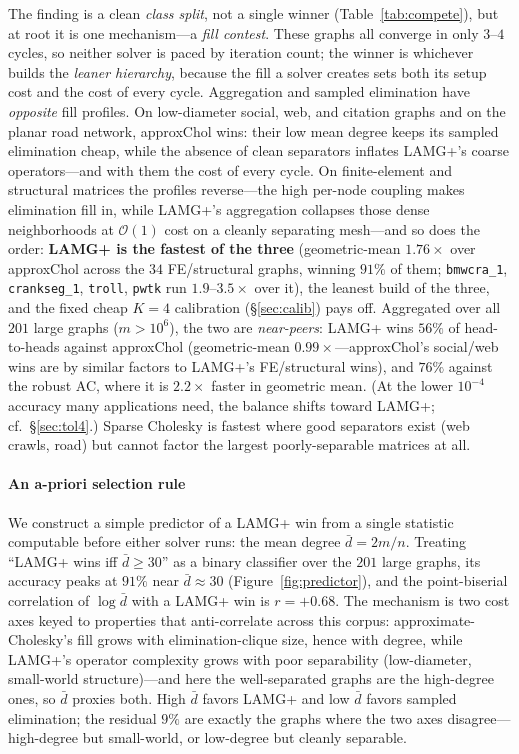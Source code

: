\documentclass[review]{siamart220329}
\newcommand{\Oone}{\mathcal{O}(1)}
\begin{document}
The finding is a clean \emph{class split}, not a single winner (Table~\ref{tab:compete}), but at root it is one
mechanism---a \emph{fill contest}. These graphs all converge in only $3$--$4$ cycles, so neither
solver is paced by iteration count; the winner is whichever builds the \emph{leaner hierarchy},
because the fill a solver creates sets both its setup cost and the cost of every cycle. Aggregation
and sampled elimination have \emph{opposite} fill profiles. On low-diameter social, web, and citation
graphs and on the planar road network, approxChol wins: their low mean degree keeps its sampled
elimination cheap, while the absence of clean separators inflates LAMG+'s coarse operators---and with
them the cost of every cycle. On finite-element and structural matrices the profiles reverse---the high per-node
coupling makes elimination fill in, while LAMG+'s aggregation collapses those dense neighborhoods at
$\Oone$ cost on a cleanly separating mesh---and so does the order: \textbf{LAMG+ is the fastest of the three} (geometric-mean
$1.76\times$ over approxChol across the $34$ FE/structural graphs, winning $91\%$ of them;
\texttt{bmwcra\_1}, \texttt{crankseg\_1}, \texttt{troll}, \texttt{pwtk} run $1.9$--$3.5\times$ over
it), the leanest build of the three, and the fixed cheap $K{=}4$ calibration (\S\ref{sec:calib})
pays off. Aggregated over all
$201$ large graphs ($m>10^6$), the two are \emph{near-peers}: LAMG+ wins $56\%$ of head-to-heads
against approxChol (geometric-mean $0.99\times$---approxChol's social/web
wins are by similar factors to LAMG+'s FE/structural wins), and $76\%$ against the robust AC, where
it is $2.2\times$ faster in geometric mean. (At the lower $10^{-4}$ accuracy many applications need, the balance shifts toward LAMG+; cf.~\S\ref{sec:tol4}.) Sparse Cholesky is fastest where good separators exist (web crawls, road)
but cannot factor the largest poorly-separable matrices at all.

\paragraph{An a-priori selection rule} We construct a simple predictor of a LAMG+ win from a single
statistic computable before either solver runs: the mean degree $\bar d=2m/n$. Treating
``LAMG+ wins iff $\bar d\ge30$'' as a binary classifier over the $201$ large graphs, its accuracy
peaks at $91\%$ near $\bar d\approx30$ (Figure~\ref{fig:predictor}), and the point-biserial
correlation of $\log\bar d$ with a LAMG+ win is $r=+0.68$. The mechanism is two cost axes keyed to properties that anti-correlate across this
corpus: approximate-Cholesky's fill grows with elimination-clique size, hence with degree, while
LAMG+'s operator complexity grows with poor separability (low-diameter, small-world structure)---and
here the well-separated graphs are the high-degree ones, so $\bar d$ proxies both. High $\bar d$
favors LAMG+ and low $\bar d$ favors sampled elimination; the residual $9\%$ are exactly the graphs
where the two axes disagree---high-degree but small-world, or low-degree but cleanly separable.
\end{document}
